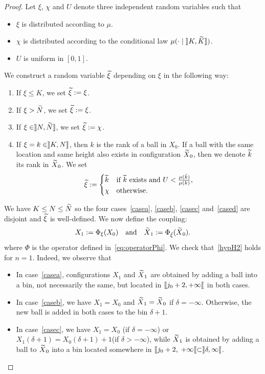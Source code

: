 \documentclass[AHL,Unicode,longabstracts,published]{cedram}
\let\oldin\in
\renewcommand{\in}{\mathchoice{\oldin}{\oldin}{\,\oldin\,}{\,\oldin\,}}
\newcommand*{\relabel}{\renewcommand{\labelenumi}{(\theenumi)}}
\newcommand*{\alphenumi}{\renewcommand*{\theenumi}{\alph{enumi}}\relabel}
\let\oldtilde\tilde
\renewcommand*{\tilde}[1]{\mathchoice{\widetilde{#1}}{\widetilde{#1}}{\oldtilde{#1}}{\oldtilde{#1}}}
\newcommand{\llbracket}{\mathopen{[\mkern -2.7mu[}}
\newcommand{\rrbracket}{\mathclose{]\mkern -2.7mu]}}
\newcommand{\llbracketclose}{\mathclose{[\mkern -2.7mu[}}
\newcommand{\rrbracketopen}{\mathopen{]\mkern -2.7mu]}}
\newcommand{\llb}{\llbracket}
\newcommand{\rrb}{\rrbracket}
\begin{document}
\begin{proof}
\goodbreak
Let $\xi$, $\chi$ and $U$ denote three independent random variables such that
\begin{itemize}
\item $\xi$ is distributed according to $\mu$.
\item $\chi$ is distributed according to the conditional law $\mu(\cdot \mid \rrbracketopen K, \tilde{K}\rrb)$.
\item $U$ is uniform in $[0,1]$.
\end{itemize}
We construct a random variable $\tilde{\xi}$ depending on $\xi$ in the following way:
\begin{enumerate}\alphenumi
\item\label{casea} If $\xi \leq K$, we set $\tilde{\xi}
:= \xi$.
\item\label{caseb} If $\xi > \tilde{N}$, we set $\tilde{\xi}
:= \xi$.
\item\label{casec} If $\xi \in \rrb N, \tilde{N}\rrb$, we set $\tilde{\xi}
:= \chi$.
\item\label{cased} If $\xi = k \in \rrb K,N\rrb$, then $k$ is the rank of a ball in $X_0$. If a ball with the same location and same height also exists in configuration $\tilde{X}_0$, then we denote $\tilde{k}$ its rank in $\tilde{X}_0$. We set
\[
\tilde{\xi}
:=
\begin{cases}
\tilde{k} & \text{if }\tilde{k}\text{ exists and }U < \frac{\mu(\tilde{k})}{\mu(k)},\\
\chi & \text{otherwise.}
\end{cases}
\]
\end{enumerate}
We have $K \leq N \leq \tilde{N}$ so the four cases~\eqref{casea}, \eqref{caseb}, \eqref{casec} and~\eqref{cased} are disjoint and $\tilde{\xi}$ is well-defined. We now define the coupling:
\[
X_1
:= \Phi_\xi(X_0) \quad \text{and}\quad \tilde{X}_1
:= \Phi_{\tilde\xi}(\tilde{X}_0).
\]
where $\Phi$ is the operator defined in~\eqref{eq:operatorPhi}. We check that~\eqref{hypH2} holds for $n=1$. Indeed, we observe that
\begin{itemize}
\item In case~\eqref{casea}, configurations $X_1$ and $\tilde{X}_1$ are obtained by adding a ball into a bin, not necessarily the same, but located in $\llb j_0 + 2, +\infty\llbracketclose $ in both cases.
\item In case~\eqref{caseb}, we have $X_1 = X_0$ and $\tilde{X}_1 = \tilde{X}_0$ if $\delta = -\infty$. Otherwise, the new ball is added in both cases to the bin $\delta +1$.
\item In case~\eqref{casec}, we have $X_1 = X_0$ (if $\delta =-\infty$) or $X_1(\delta+1) = X_0(\delta+1)+1$\linebreak (if $\delta > -\infty$), while $\tilde{X}_1$ is obtained by adding a ball to $\tilde{X}_0$ into a bin located somewhere in $\llb j_0+2,\;+\infty\llb \subset \rrb \delta,\infty\llbracketclose$.

\end{itemize}
\end{proof}
\end{document}
